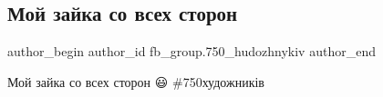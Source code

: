  
 
 
 
 

\subsection{Мой зайка со всех сторон}
\label{sec:26_03_2018.fb.fb_group.750_hudozhnykiv.1.moj_zajka_so_vseh_storon}

\ifcmt
 author_begin
   author_id fb_group.750_hudozhnykiv
 author_end
\fi

Мой зайка со всех сторон 😃 \#750художників

